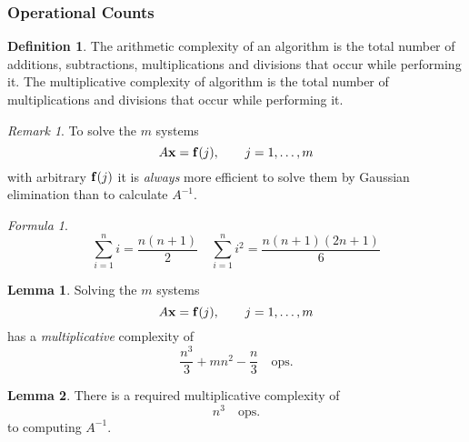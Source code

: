 \documentclass[11pt,letterpaper]{article}
\numberwithin{figure}{section} %
\newcommand{\inv}[1]{#1^{-1}}
\newcommand{\ops}{\quad\text{ops.}}
\newcommand{\keyword}[1]{\colorbox{cyan!20!}{#1}}
\theoremstyle{definition}
\theoremstyle{definition}
\theoremstyle{definition}
\newtheorem{lemma}{Lemma}[subsection]
\theoremstyle{definition}
\newtheorem{definition}{Definition}[subsection]
\theoremstyle{definition}
\theoremstyle{remark}
\newtheorem*{remark}{Remark}
\theoremstyle{remark}
\theoremstyle{definition}
\theoremstyle{remark}
\newtheorem*{formula}{Formula}
\theoremstyle{remark}
\begin{document}
\begin{multicols*}{3}
\subsubsection{Operational Counts}
\begin{definition}
The \keyword{arithmetic complexity} of an algorithm is the total number of
additions, subtractions, multiplications and divisions that occur while
performing it. The \keyword{multiplicative complexity} of algorithm is the
total number of multiplications and divisions that occur while performing it.
\end{definition}
\begin{remark}
To solve the $m$ systems
\[
	A\vb{x} = \vb{f}(j), \qquad j = 1,\ldots, m
\]
with arbitrary $\vb{f}(j)$ it is \emph{always} more efficient to solve them
by Gaussian elimination than to calculate $\inv{A}$.
\end{remark}
\begin{formula}
	\[
		\sum_{i=1}^n i = \frac{n(n+1)}{2} \quad \sum_{i=1}^n i^2 =
		\frac{n(n+1)(2n+1)}{6}
	\]
\end{formula}
\begin{lemma}
	Solving the $m$ systems
\[
	A\vb{x} = \vb{f}(j), \qquad j = 1,\ldots, m
\]
has a \emph{multiplicative} complexity of 
\[
	\frac{n^3}{3} + mn^2 - \frac{n}{3} \ops
\]
\end{lemma}
\begin{lemma}
	There is a required multiplicative complexity of
	\[
		n^3 \ops
	\]
	to computing $\inv{A}$.
\end{lemma}

\end{multicols*}
\end{document}
